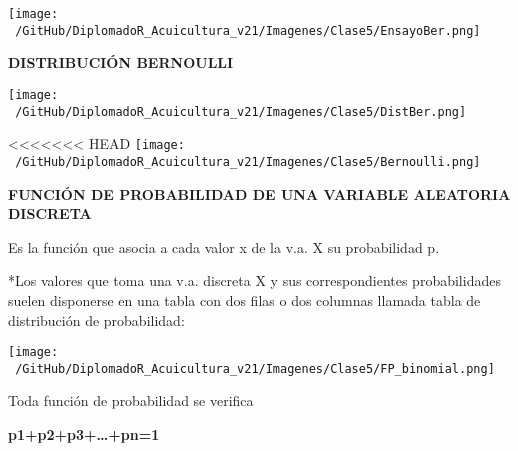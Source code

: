 \documentclass[ignorenonframetext,]{beamer}
\begin{document}
\begin{frame}{}
\begin{block}{}

\texttt{[image: ~/GitHub/DiplomadoR\_Acuicultura\_v21/Imagenes/Clase5/EnsayoBer.png]}

\end{block}

\end{frame}

\begin{frame}{}
\protect\hypertarget{section-7}{}

\textbf{DISTRIBUCIÓN BERNOULLI}

\texttt{[image: ~/GitHub/DiplomadoR\_Acuicultura\_v21/Imagenes/Clase5/DistBer.png]}

\end{frame}

\begin{frame}{}
\protect\hypertarget{section-8}{}

<<<<<<< HEAD
\texttt{[image: ~/GitHub/DiplomadoR\_Acuicultura\_v21/Imagenes/Clase5/Bernoulli.png]}

\end{frame}

\begin{frame}{}
\protect\hypertarget{section-9}{}

\textbf{FUNCIÓN DE PROBABILIDAD DE UNA VARIABLE ALEATORIA DISCRETA}

Es la función que asocia a cada valor x de la v.a. X su probabilidad p.

*Los valores que toma una v.a. discreta X y sus correspondientes
probabilidades suelen disponerse en una tabla con dos filas o dos
columnas llamada tabla de distribución de probabilidad:

\texttt{[image: ~/GitHub/DiplomadoR\_Acuicultura\_v21/Imagenes/Clase5/FP\_binomial.png]}

Toda función de probabilidad se verifica

\textbf{p1+p2+p3+\ldots{}+pn=1}

\end{frame}
\end{document}

